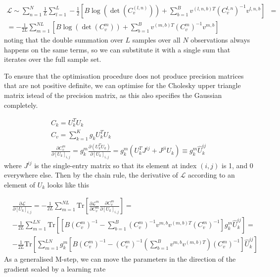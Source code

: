 \documentclass{paper}
\begin{document}
\begin{equation}
\begin{split}
\mathcal{L} \sim \sum_{n=1}^N \frac{1}{L} \sum_{l=1}^L -\frac{1}{2} \left[B \log \left( \det \left( C_v^{(l,n)} \right) \right) + \sum_{b=1}^B v^{(l,n,b)T}  \left( C_v^{l,n} \right)^{-1} v^{l,n,b}\right]& = \\
= -\frac{1}{2L} \sum_{m=1}^{NL} \left[B \log \left( \det \left( C_v^{m} \right) \right) + \sum_{b=1}^B v^{(m,b)T}  \left( C_v^{m} \right)^{-1} v^{m,b}\right]&
\end{split}
\end{equation}
%
noting that the double summation over $L$ samples over all $N$ observations always happens on the same terms, so we can substitute it with a single sum that iterates over the full sample set.

To ensure that the optimisation procedure does not produce precision matrices that are not positive definite, we can optimise for the Cholesky upper triangle matrix istead of the precision matrix, as this also specifies the Gaussian completely.

\begin{eqnarray}
C_k = U_k^T U_k \\
C_v = \sum_{k=1}^K g_k U_k^T U_k \\
\frac{\partial C_v^m}{\partial \left[ U_k \right]_{i,j}} = g_k^m \frac{\partial \left( U_k^T U_k \right)}{\partial \left[ U_k \right]_{i,j}} = g_k^m \left( U_k^T J^{ij} + J^{ji} U_k \right) \equiv g_k^m \hat U_k^{ij}
\end{eqnarray}
%
where $J^{ij}$ is the single-entry matrix so that its element at index $(i,j)$ is 1, and 0 everywhere else. Then by the chain rule, the derivative of $\mathcal{L}$ according to an element of $U_k$ looks like this

\begin{equation}
\begin{split}
&\frac{\partial \mathcal{L}}{\partial \left[ U_k \right]_{i,j}} = -\frac{1}{2L} \sum_{m=1}^{NL} \textrm{Tr} \left[ \frac{\partial \mathcal{L}^m}{\partial C_v^m} \frac{\partial C_v^m}{\partial \left[ U_k \right]_{i,j}} \right] = \\
& -\frac{1}{2L} \sum_{m=1}^{LN} \textrm{Tr} \left[  \left[ B \left( C_v^m \right)^{-1} - \sum_{b=1}^B \left( C_v^m \right)^{-1} v^{m,b} v^{(m,b)T} \left( C_v^m \right)^{-1} \right] g_k^{m} \hat U_k^{ij} \right] = \\
& -\frac{1}{2L} \textrm{Tr} \left[ \sum_{m=1}^{LN} g_k^{m} \left[ B \left( C_v^m \right)^{-1} -  \left( C_v^m \right)^{-1} \left( \sum_{b=1}^B v^{m,b} v^{(m,b)T} \right) \left( C_v^m \right)^{-1} \right] \hat U_k^{ij} \right]
\end{split}
\end{equation}
%
As a generalised M-step, we can move the parameters in the direction of the gradient scaled by a learning rate
\end{document}
